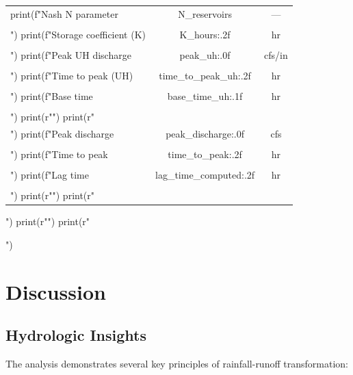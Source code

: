 \documentclass[a4paper, 11pt]{article}
\begin{document}
\begin{pycode}
\begin{table}[htbp]
\begin{tabular}{lcc}
print(f"Nash N parameter & {N_reservoirs} & --- \\\\")
print(f"Storage coefficient (K) & {K_hours:.2f} & hr \\\\")
print(f"Peak UH discharge & {peak_uh:.0f} & cfs/in \\\\")
print(f"Time to peak (UH) & {time_to_peak_uh:.2f} & hr \\\\")
print(f"Base time & {base_time_uh:.1f} & hr \\\\")
print(r"\midrule")
print(r"\multicolumn{3}{l}{\textit{Direct Runoff Hydrograph}} \\")
print(f"Peak discharge & {peak_discharge:.0f} & cfs \\\\")
print(f"Time to peak & {time_to_peak:.2f} & hr \\\\")
print(f"Lag time & {lag_time_computed:.2f} & hr \\\\")
print(r"\bottomrule")
print(r"\end{tabular}")
print(r"\label{tab:results}")
print(r"\end{table}")
\end{pycode}

\section{Discussion}

\subsection{Hydrologic Insights}

The analysis demonstrates several key principles of rainfall-runoff transformation:
\end{document}
